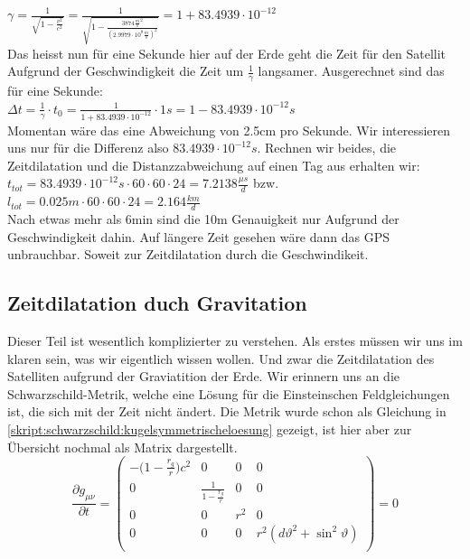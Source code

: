 \begin{refsection}
\(\gamma = \frac{1}{\sqrt{1 - \frac{v^2}{c^2}}} = \frac{1}{\sqrt{1 - \frac{3874 \frac{m}{s}^2}{(2.9979 \cdot 10^8 \frac{m}{s} )^2}}} = 1 + 83.4939 \cdot 10^{-12} \) \\

\noindent{}Das heisst nun für eine Sekunde hier auf der Erde geht die Zeit für den Satellit Aufgrund der Geschwindigkeit die Zeit um \( \frac{1}{\gamma}\) langsamer. Ausgerechnet sind das für eine Sekunde: \\

\( \Delta t = \frac{1}{\gamma} \cdot t_0 = \frac{1}{1 + 83.4939 \cdot 10^{-12}} \cdot 1s = 1 - 83.4939 \cdot 10^{-12}s \) \\

\noindent{}Momentan wäre das eine Abweichung von 2.5cm pro Sekunde. Wir interessieren uns nur für die Differenz also \( 83.4939 \cdot 10^{-12}s \). Rechnen wir beides, die Zeitdilatation und die Distanzzabweichung auf einen Tag aus erhalten wir:\\

\( t_{tot} = 83.4939 \cdot 10^{-12}s \cdot 60 \cdot 60 \cdot 24 = 7.2138  \frac{\mu s}{d} \) bzw. \\

\( l_{tot} = 0.025m \cdot 60 \cdot 60 \cdot 24 = 2.164 \frac{km}{d} \) \\

\noindent{}Nach etwas mehr als 6min sind die 10m Genauigkeit nur Aufgrund der Geschwindigkeit dahin. Auf längere Zeit gesehen wäre dann das GPS unbrauchbar. Soweit zur Zeitdilatation durch die Geschwindikeit.

\subsection{Zeitdilatation duch Gravitation}
Dieser Teil ist wesentlich komplizierter zu verstehen. Als erstes müssen wir uns im klaren sein, was wir eigentlich wissen wollen. Und zwar die Zeitdilatation des Satelliten aufgrund der Graviatition der Erde. Wir erinnern uns an die Schwarzschild-Metrik, welche eine Lösung für die Einsteinschen Feldgleichungen ist, die sich mit der Zeit nicht ändert. Die Metrik wurde schon als Gleichung in \ref{skript:schwarzschild:kugelsymmetrischeloesung} gezeigt, ist hier aber zur Übersicht nochmal als Matrix dargestellt. \\

\begin{equation}
\frac{\partial g_{\mu\nu}}{\partial t}= 
\begin{pmatrix}
-\biggl(1-\frac{r_g}r\biggr)c^2 & 0 & 0 & 0 \\
0 & \frac1{\displaystyle 1-\frac{r_g}r} & 0 & 0 \\
0 & 0 &  r^2 & 0 \\
0 & 0 & 0 & r^2 (d\vartheta^2 + \sin^2\vartheta) \\
\end{pmatrix}
= 0
\end{equation} \\


\end{refsection}
